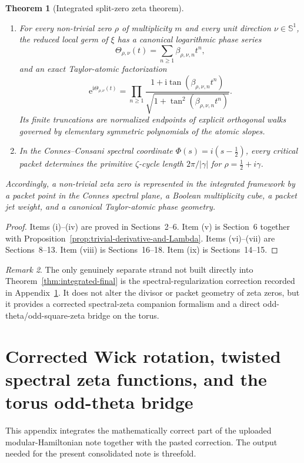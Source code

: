 \documentclass[11pt,a4paper]{article}
\numberwithin{equation}{section}
\newtheorem{theorem}{Theorem}[section]
\theoremstyle{definition}
\theoremstyle{remark}
\newtheorem{remark}[theorem]{Remark}
\newcommand{\Sph}{\mathbb S^1}
\newcommand{\e}{\mathrm e}
\newcommand{\ii}{\mathrm i}
\begin{document}
\begin{theorem}[Integrated split-zero zeta theorem]
\begin{enumerate}[label=(\roman*)]
\item For every non-trivial zero $\rho$ of multiplicity $m$ and every unit direction $\nu\in\Sph$, the reduced local germ of $\xi$ has a canonical logarithmic phase series
\[
\Theta_{\rho,\nu}(t)=\sum_{n\ge 1}\beta_{\rho,\nu,n}t^n,
\]
and an exact Taylor-atomic factorization
\[
\e^{\ii\Theta_{\rho,\nu}(t)}=\prod_{n\ge 1}\frac{1+\ii\tan(\beta_{\rho,\nu,n}t^n)}{\sqrt{1+\tan^2(\beta_{\rho,\nu,n}t^n)}}.
\]
Its finite truncations are normalized endpoints of explicit orthogonal walks governed by elementary symmetric polynomials of the atomic slopes.
\item In the Connes--Consani spectral coordinate $\Phi(s)=i(s-\tfrac12)$, every critical packet determines the primitive $\zeta$-cycle length $2\pi/|\gamma|$ for $\rho=\tfrac12+i\gamma$.
\end{enumerate}

Accordingly, a non-trivial zeta zero is represented in the integrated framework by a packet point in the Connes spectral plane, a Boolean multiplicity cube, a packet jet weight, and a canonical Taylor-atomic phase geometry.
\end{theorem}

\begin{proof}
Items (i)--(iv) are proved in Sections~2--6.  Item (v) is Section~6 together with Proposition~\ref{prop:trivial-derivative-and-Lambda}.  Items (vi)--(vii) are Sections~8--13.  Item (viii) is Sections~16--18.  Item (ix) is Sections~14--15.
\end{proof}

\begin{remark}
The only genuinely separate strand not built directly into Theorem~\ref{thm:integrated-final} is the spectral-regularization correction recorded in Appendix~\ref{app:wick}.  It does not alter the divisor or packet geometry of zeta zeros, but it provides a corrected spectral-zeta companion formalism and a direct odd-theta/odd-square-zeta bridge on the torus.
\end{remark}

\appendix

\section{Corrected Wick rotation, twisted spectral zeta functions, and the torus odd-theta bridge}\label{app:wick}

This appendix integrates the mathematically correct part of the uploaded modular-Hamiltonian note together with the pasted correction.  The output needed for the present consolidated note is threefold.
\end{document}
